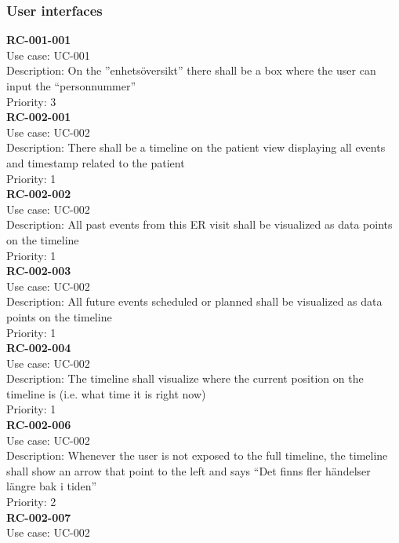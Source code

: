 \subsubsection{User interfaces}
\textbf{RC-001-001} \\
Use case: UC-001 \\
Description: On the ''enhetsöversikt'' there shall be a box where the user can input the “personnummer” \\
Priority: 3\\
\newline
\textbf{RC-002-001} \\
Use case: UC-002 \\
Description: There shall be a timeline on the patient view displaying all events and timestamp related to the patient \\
Priority: 1\\
\newline
\textbf{RC-002-002} \\
Use case: UC-002 \\
Description: All past events from this ER visit shall be visualized as data points on the timeline\\
Priority: 1 \\
\newline
\textbf{RC-002-003} \\
Use case: UC-002 \\
Description: All future events scheduled or planned shall be visualized as data points on the timeline \\
Priority: 1 \\
\newline
\textbf{RC-002-004} \\
Use case: UC-002 \\
Description: The timeline shall visualize where the current position on the timeline is (i.e. what time it is right now)\\
Priority: 1 \\
\newline
\textbf{RC-002-006} \\
Use case: UC-002 \\
Description: Whenever the user is not exposed to the full timeline, the timeline shall show an arrow that point to the left and says “Det finns fler händelser längre bak i tiden” \\
Priority:  2\\
\newline
\textbf{RC-002-007} \\
Use case: UC-002 \\
